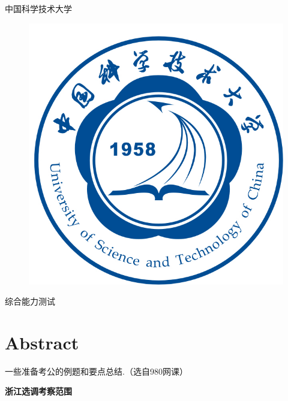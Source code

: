 \documentclass{article}
\numberwithin{equation}{section}						%
\numberwithin{figure}{section}							%
\begin{document}
\begin{sloppypar}
	\thispagestyle{empty}
	\begin{center}
		\parbox[t][3cm][c]{\textwidth}{
		\begin{center}
				{\kaishu\Huge 中国科学技术大学}
		\end{center} }
		\parbox[t][8cm][c]{\textwidth}{\huge
		\begin{center} 
				\begin{figure}[H]
					\centering
					\includegraphics[width=0.4\linewidth]{ustcblue}
				\end{figure}
		\end{center} }
		\parbox[t][2cm][t]{\textwidth}{
		\begin{center}  
				{\kaishu\huge 综合能力测试}
		\end{center} }
		
		\parbox[t][5cm][b]{0.7\textwidth}{
			{\Large{} }  }
		
		\parbox[t][5cm][c]{\textwidth}{ {\large
            } }
	\end{center}
	\clearpage
	

	\newpage\tableofcontents\newpage

\section{Abstract}

一些准备考公的例题和要点总结.（选自980网课）

\textbf{浙江选调考察范围}


\end{sloppypar}
\end{document}
